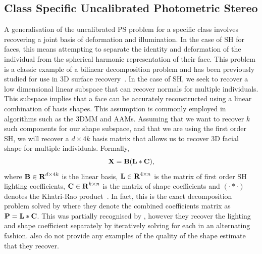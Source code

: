 \subsection{Class Specific Uncalibrated Photometric Stereo}\label{subsec:imag_coll_class_uncalibrated_ps}
A generalisation of the uncalibrated PS problem for a specific class involves
recovering a joint basis of deformation and illumination. In the case of SH for
faces, this means attempting to separate the identity and deformation of the
individual from the spherical harmonic representation of their face. 
This problem is a classic example of a bilinear
decomposition problem and has been previously studied for use in 3D surface
recovery~\cite{zhou2007appearance,minsik2014realtime,minsik2011fast,%
lee2005bilinear,KemelmacherShlizerman:2013iv}. In
the case of SH, we seek to recover a low dimensional linear subspace that can
recover normals for multiple individuals. This subspace implies that a face can
be accurately reconstructed using a linear combination of basis shapes. This
assumption is commonly employed in algorithms such as the 3DMM and AAMs.
Assuming that we want to recover $k$ such components for our shape subspace, and
that we are using the first order SH, we will recover a $d \times 4k$ basis
matrix that allows us to recover 3D facial shape for multiple individuals.
Formally,
\begin{equation}\label{eq:class_specific_ps}
        \boldsymbol{\mathbf{X}} = \boldsymbol{\mathbf{B}} (\boldsymbol{\mathbf{L}} \ast \boldsymbol{\mathbf{C}}),
\end{equation}
where $\boldsymbol{\mathbf{B}} \in \boldsymbol{\mathbf{R}}^{d \times 4k}$ is the linear basis,
$\boldsymbol{\mathbf{L}} \in \boldsymbol{\mathbf{R}}^{4 \times n}$ is the matrix of first order SH lighting
coefficients, $\boldsymbol{\mathbf{C}} \in \boldsymbol{\mathbf{R}}^{k \times n}$ is the matrix of shape
coefficients and $(\cdot \ast \cdot)$ denotes the Khatri-Rao
product~\cite{khatri1968solutions}. In fact, this is the exact decomposition problem
solved by \citet{KemelmacherShlizerman:2013iv} where they denote the combined coefficients
matrix as $\boldsymbol{\mathbf{P}} = \boldsymbol{\mathbf{L}} \ast \boldsymbol{\mathbf{C}}$. This was partially
recognised by \citet{zhou2007appearance}, however they recover the lighting and shape
coefficient separately by iteratively solving for each in an alternating
fashion. \citet{zhou2007appearance} also do not provide any examples of the quality of the
shape estimate that they recover.

